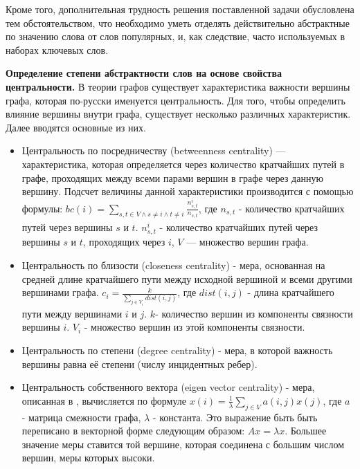 Кроме того, дополнительная трудность решения поставленной задачи обусловлена тем обстоятельством, что необходимо уметь отделять действительно абстрактные по значению слова от слов популярных, и, как следствие, часто используемых в наборах ключевых слов.

\textbf{Определение степени абстрактности слов на основе свойства центральности.}
В теории графов существует характеристика важности вершины графа, которая по-русски именуется центральность. Для того, чтобы определить влияние вершины внутри графа, существует несколько различных характеристик. Далее вводятся основные из них.
\begin{itemize}
    \item Центральность по посредничеству (betweenness centrality) — характеристика, которая определяется через количество кратчайших путей в графе, проходящих между всеми парами вершин в графе через данную вершину. Подсчет величины данной характеристики производится с помощью формулы: $bc(i) = \underset{s,t\in V \wedge s \neq i \wedge t \neq i}\sum_{}{\frac{n^i_{s,t}}{n_{s,t}}}$, где $n_{s,t}$ - количество кратчайших путей через вершины $s$ и $t$. $n^i_{s,t}$ - количество кратчайших путей через вершины $s$ и $t$, проходящих через $i$, $V$ — множество вершин графа.
    \item Центральность по близости (closeness centrality) - мера, основанная на средней длине кратчайшего пути между исходной вершиной и всеми другими вершинами графа.  $c_i=\frac{k}{\underset{j\in V_i}\sum_{}{dist(i,j)}}$, где $dist(i,j)$ - длина кратчайшего пути между вершинами $i$ и $j$. $k$- количество вершин из компоненты связности вершины $i$. $V_i$ - множество вершин из этой компоненты связности.  \item Центральность по степени (degree centrality) - мера, в которой важность вершины равна её степени (числу инцидентных ребер).
\item Центральность собственного вектора (eigen vector centrality) - мера, описанная в \cite{eigen_vect_cent}, вычисляется по формуле $x(i) = \frac{1}{\lambda}\underset{j \in V}\sum{a(i,j)x(j)}$, где $a$ - матрица смежности графа, $\lambda$ - константа. Это выражение быть быть переписано в векторной форме следующим образом: $Ax = \lambda x$. Большее значение меры ставится той вершине, которая соединена с большим числом вершин, меры которых высоки.

\end{itemize}
